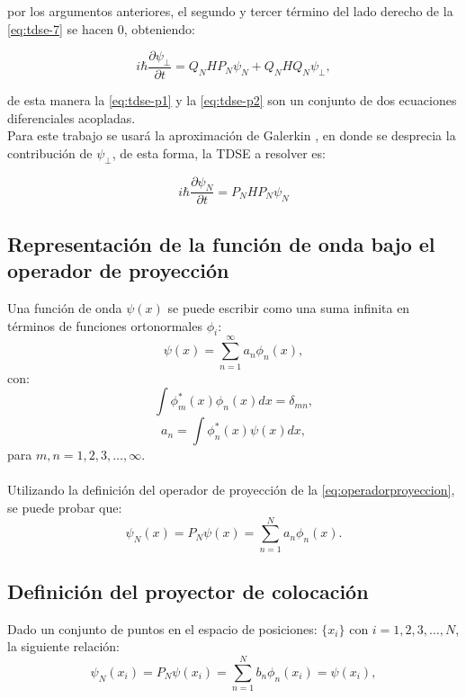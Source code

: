 \noindent por los argumentos anteriores, el segundo y tercer término del lado derecho de la \autoref{eq:tdse-7} se hacen $0$, obteniendo:

\begin{equation}
  \label{eq:tdse-p2}
  i\hbar\frac{\partial \psi_{\perp}}{\partial t} = Q_NHP_N\psi_N + Q_NHQ_N\psi_{\perp},
\end{equation}

de esta manera la \autoref{eq:tdse-p1} y la \autoref{eq:tdse-p2} son un conjunto de dos ecuaciones diferenciales acopladas.
\\
Para este trabajo se usará la aproximación de Galerkin \cite{Gottlieb}, en donde se desprecia la contribución de $\psi_{\perp}$, de esta forma, la \acs{TDSE} a resolver es:
\begin{tcolorbox}[colback=CTtitle!5!white,colframe=CTtitle!85!white]%
\begin{equation}
\label{eq:TDSEN}
i\hbar \frac{\partial \psi_N}{\partial t} = P_NHP_N\psi_N
\end{equation}
\end{tcolorbox}

\subsection{Representación de la función de onda bajo el operador de proyección}

Una función de onda $\psi(x)$ se puede escribir como una suma infinita en términos de funciones ortonormales $\phi_i$:
\begin{equation}
  \label{eq:wavefuninf}
  \psi(x) = \sum_{n=1}^{\infty}a_n\phi_n(x),
\end{equation}
con:
\[ \int \phi_m^*(x)\phi_n(x)dx = \delta_{mn}, \]
\[ a_n = \int \phi_n^*(x)\psi(x)dx,\]
para $m,n=1,2,3,\dots, \infty$.
\\
\\
Utilizando la definición del operador de proyección de la \autoref{eq:operadorproyeccion}, se puede probar que:
\begin{equation}
  \label{eq:wavepacketinit}
  \psi_N(x) = P_N\psi(x)=\sum_{n=1}^{N}a_n\phi_n(x).
\end{equation}

\subsection{Definición del proyector de colocación}\label{sec:collocation}
Dado un conjunto de puntos en el espacio de posiciones: $\{x_i\}$ con $i=1,2,3,\dots, N$, la siguiente relación:
\begin{equation}
  \label{eq:wavefunexp}
  \psi_N(x_i) = P_N\psi(x_i)=\sum_{n=1}^{N}b_n\phi_n(x_i) = \psi(x_i),
\end{equation}

